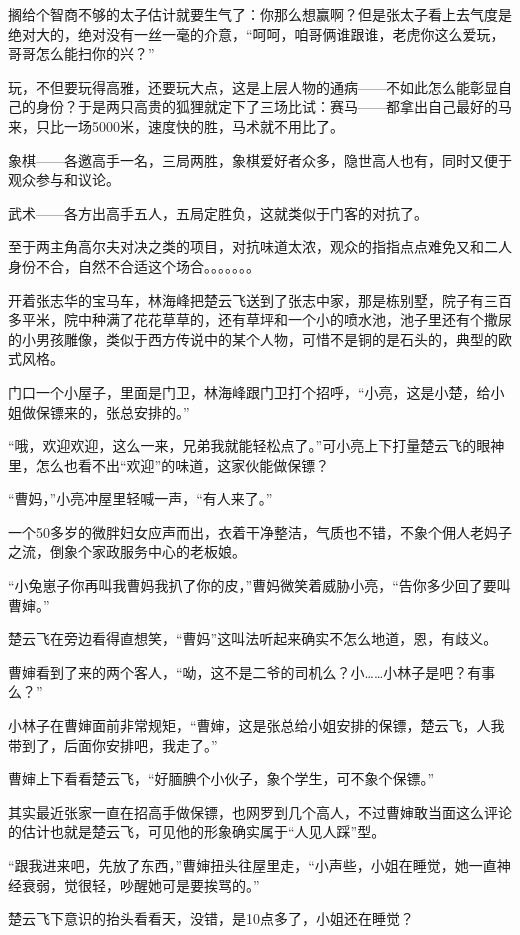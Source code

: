 搁给个智商不够的太子估计就要生气了：你那么想赢啊？但是张太子看上去气度是绝对大的，绝对没有一丝一毫的介意，“呵呵，咱哥俩谁跟谁，老虎你这么爱玩，哥哥怎么能扫你的兴？”

玩，不但要玩得高雅，还要玩大点，这是上层人物的通病——不如此怎么能彰显自己的身份？于是两只高贵的狐狸就定下了三场比试：赛马——都拿出自己最好的马来，只比一场5000米，速度快的胜，马术就不用比了。

象棋——各邀高手一名，三局两胜，象棋爱好者众多，隐世高人也有，同时又便于观众参与和议论。

武术——各方出高手五人，五局定胜负，这就类似于门客的对抗了。

至于两主角高尔夫对决之类的项目，对抗味道太浓，观众的指指点点难免又和二人身份不合，自然不合适这个场合。。。。。。。

开着张志华的宝马车，林海峰把楚云飞送到了张志中家，那是栋别墅，院子有三百多平米，院中种满了花花草草的，还有草坪和一个小的喷水池，池子里还有个撒尿的小男孩雕像，类似于西方传说中的某个人物，可惜不是铜的是石头的，典型的欧式风格。

门口一个小屋子，里面是门卫，林海峰跟门卫打个招呼，“小亮，这是小楚，给小姐做保镖来的，张总安排的。”

“哦，欢迎欢迎，这么一来，兄弟我就能轻松点了。”可小亮上下打量楚云飞的眼神里，怎么也看不出“欢迎”的味道，这家伙能做保镖？

“曹妈，”小亮冲屋里轻喊一声，“有人来了。”

一个50多岁的微胖妇女应声而出，衣着干净整洁，气质也不错，不象个佣人老妈子之流，倒象个家政服务中心的老板娘。

“小兔崽子你再叫我曹妈我扒了你的皮，”曹妈微笑着威胁小亮，“告你多少回了要叫曹婶。”

楚云飞在旁边看得直想笑，“曹妈”这叫法听起来确实不怎么地道，恩，有歧义。

曹婶看到了来的两个客人，“呦，这不是二爷的司机么？小……小林子是吧？有事么？”

小林子在曹婶面前非常规矩，“曹婶，这是张总给小姐安排的保镖，楚云飞，人我带到了，后面你安排吧，我走了。”

曹婶上下看看楚云飞，“好腼腆个小伙子，象个学生，可不象个保镖。”

其实最近张家一直在招高手做保镖，也网罗到几个高人，不过曹婶敢当面这么评论的估计也就是楚云飞，可见他的形象确实属于“人见人踩”型。

“跟我进来吧，先放了东西，”曹婶扭头往屋里走，“小声些，小姐在睡觉，她一直神经衰弱，觉很轻，吵醒她可是要挨骂的。”

楚云飞下意识的抬头看看天，没错，是10点多了，小姐还在睡觉？


